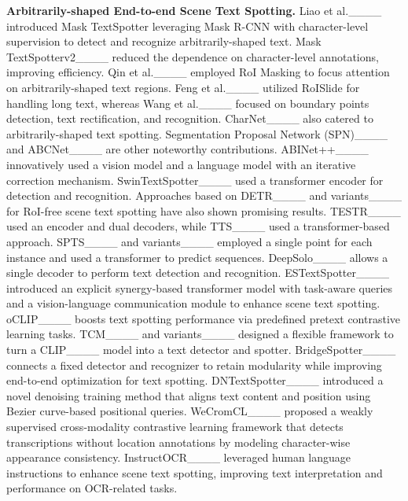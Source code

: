     \noindent\textbf{Arbitrarily-shaped End-to-end Scene Text Spotting.} 
    Liao et al.____ introduced Mask TextSpotter leveraging Mask R-CNN with character-level supervision to detect and recognize arbitrarily-shaped text. Mask TextSpotterv2____ reduced the dependence on character-level annotations, improving efficiency. Qin et al.____ employed RoI Masking to focus attention on arbitrarily-shaped text regions. Feng et al.____ utilized RoISlide for handling long text, whereas Wang et al.____ focused on boundary points detection, text rectification, and recognition. CharNet____ also catered to arbitrarily-shaped text spotting. Segmentation Proposal Network (SPN)____ and ABCNet____ are other noteworthy contributions. ABINet++____ innovatively used a vision model and a language model with an iterative correction mechanism. SwinTextSpotter____ used a transformer encoder for detection and recognition. Approaches based on DETR____ and variants____ for RoI-free scene text spotting have also shown promising results. TESTR____ used an encoder and dual decoders, while TTS____ used a transformer-based approach. SPTS____ and variants____ employed a single point for each instance and used a transformer to predict sequences. DeepSolo____ allows a single decoder to perform text detection and recognition. ESTextSpotter____ introduced an explicit synergy-based transformer model with task-aware queries and a vision-language communication module to enhance scene text spotting. oCLIP____ boosts text spotting performance via predefined pretext contrastive learning tasks. TCM____ and variants____ designed a flexible framework to turn a CLIP____ model into a text detector and spotter. BridgeSpotter____ connects a fixed detector and recognizer to retain modularity while improving end-to-end optimization for text spotting. DNTextSpotter____ introduced a novel denoising training method that aligns text content and position using Bezier curve-based positional queries. WeCromCL____ proposed a weakly supervised cross-modality contrastive learning framework that detects transcriptions without location annotations by modeling character-wise appearance consistency. InstructOCR____ leveraged human language instructions to enhance scene text spotting, improving text interpretation and performance on OCR-related tasks. 


